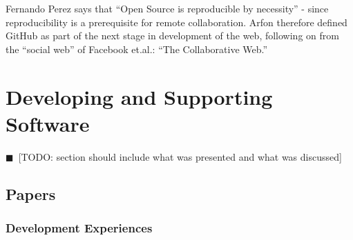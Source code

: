\documentclass[11pt, oneside]{amsart}
\newcommand{\todo}[1]{{\color{blue}$\blacksquare$~\textsf{[TODO: #1]}}}
\begin{document}
Fernando Perez says that ``Open Source is reproducible by necessity''
- since reproducibility is a prerequisite for remote collaboration.
Arfon therefore defined GitHub as part of the next stage in
development of the web, following on from the ``social web'' of
Facebook et.al.: ``The Collaborative Web.''

\section{Developing and Supporting Software} \label{sec:devel}

\todo{section should include what was presented and what was discussed}

\subsection{Papers}

\subsubsection*{Development Experiences}
\end{document}
